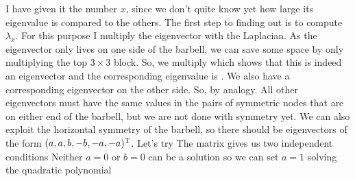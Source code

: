 I have given it the number $x$, since we don't quite know yet how large its eigenvalue is compared to the others. The first step to finding out is to compute $\lambda_x$. For this purpose I multiply the eigenvector with the Laplacian. As the eigenvector only lives on one side of the barbell, we can save some space by only multiplying the top $3\times 3$ block. So, we multiply 
which shows that this is indeed an eigenvector and the corresponding eigenvalue is
.
We also have a corresponding eigenvector on the other side. So, by analogy. 
All other eigenvectors must have the same values in the pairs of symmetric nodes that are on either end of the barbell, but we are not done with symmetry yet. We can also exploit the horizontal symmetry of the barbell, so there should be eigenvectors of the form $(a,a,b,-b,-a,-a)^{\rm T}$. Let's try   
The matrix gives us two independent conditions 
Neither $a=0$ or $b=0$ can be a solution so we can set $a=1$ solving the quadratic polynomial 

